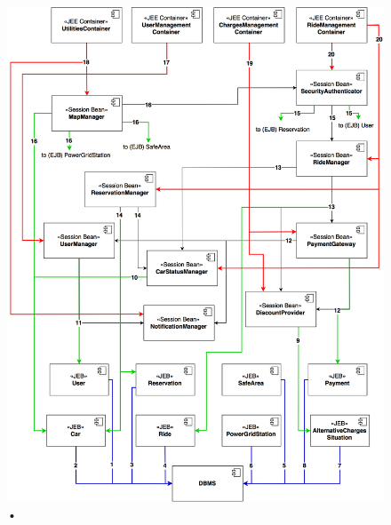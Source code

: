 \begin{figure}[H]
\begin{center}
		\includegraphics[width=\textwidth]{./integration_strategy/diagrams/overall.png}
		\caption{•}
\end{center}
\end{figure}


